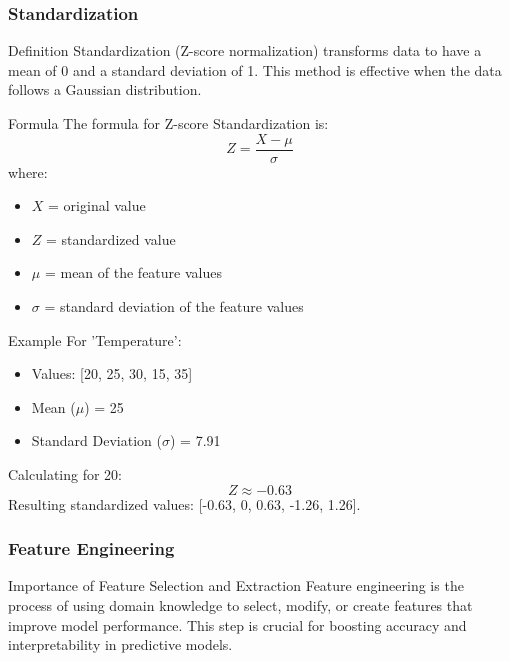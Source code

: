 \documentclass[aspectratio=169]{beamer}
\begin{document}
\begin{frame}[fragile]
    \frametitle{Standardization}
    \begin{block}{Definition}
        Standardization (Z-score normalization) transforms data to have a mean of 0 and a standard deviation of 1. This method is effective when the data follows a Gaussian distribution.
    \end{block}

    \begin{block}{Formula}
        The formula for Z-score Standardization is:
        \begin{equation}
        Z = \frac{X - \mu}{\sigma}
        \end{equation}
        where:
        \begin{itemize}
            \item \(X\) = original value
            \item \(Z\) = standardized value
            \item \(\mu\) = mean of the feature values
            \item \(\sigma\) = standard deviation of the feature values
        \end{itemize}
    \end{block}

    \begin{block}{Example}
        For 'Temperature': 
        \begin{itemize}
            \item Values: [20, 25, 30, 15, 35]
            \item Mean (\(\mu\)) = 25
            \item Standard Deviation (\(\sigma\)) = 7.91
        \end{itemize}
        Calculating for 20: 
        \[
        Z \approx -0.63
        \]
        Resulting standardized values: [-0.63, 0, 0.63, -1.26, 1.26].
    \end{block}
\end{frame}

\begin{frame}[fragile]
    \frametitle{Feature Engineering}
    \begin{block}{Importance of Feature Selection and Extraction}
        Feature engineering is the process of using domain knowledge to select, modify, or create features that improve model performance. This step is crucial for boosting accuracy and interpretability in predictive models.
    \end{block}
\end{frame}
\end{document}
